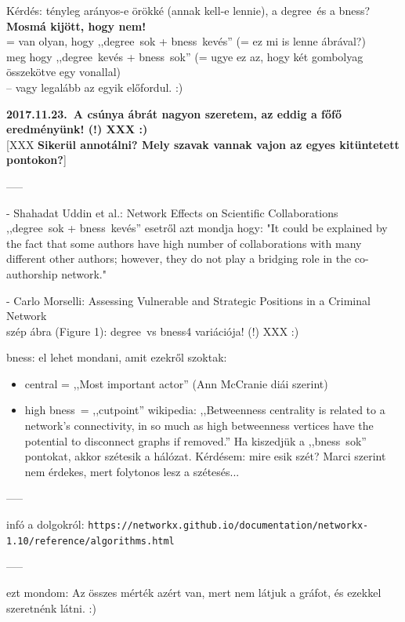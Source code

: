 \documentclass{llncs}
\newcommand{\code}[1]{\texttt{\small #1}}
\newcommand{\embf}[1]{\textbf{#1}}
\newcommand{\XXX}[1]{{\small \color{megjcolor} [XXX #1]}}
\newcommand{\XXXb}[1]{\XXX{\embf{#1}}}
\newcommand{\degree}{degree} %
\newcommand{\bness}{bness}   %
\begin{document}
Kérdés: tényleg arányos-e örökké (annak kell-e lennie),
a \degree\ és a \bness?\\
\embf{Mosmá kijött, hogy nem!}\\
= van olyan, hogy ,,\degree\ sok + \bness\ kevés''
(= ez mi is lenne ábrával?)\\
meg hogy ,,\degree\ kevés + \bness\ sok''
(= ugye ez az, hogy két gombolyag összekötve egy vonallal)\\
-- vagy legalább az egyik előfordul. :)

\embf{2017.11.23.\ A csúnya ábrát nagyon szeretem,
az eddig a főfő eredményünk! (!) XXX :)}\\
\XXXb{Sikerül annotálni?
Mely szavak vannak vajon az egyes kitüntetett pontokon?}

-----

 - Shahadat Uddin et al.:
Network Effects on Scientific Collaborations\\
%
,,\degree\ sok + \bness\ kevés'' esetről azt mondja hogy: 
"It could be explained by the fact that some authors have high number of collaborations with many different other authors; however, they do not play a bridging role in the co-authorship network."

- Carlo Morselli:
Assessing Vulnerable and Strategic Positions in a Criminal Network\\
%
szép ábra (Figure 1): \degree\ vs \bness 4 variációja! (!) XXX :)

\bness: el lehet mondani, amit ezekről szoktak:
\begin{itemize}
\item 
central = ,,Most important actor'' (Ann McCranie diái szerint)
\item 
high \bness\ = ,,cutpoint''
wikipedia: ,,Betweenness centrality is related to a network's connectivity, in so much as high betweenness vertices have the potential to disconnect graphs if removed.''
Ha kiszedjük a ,,\bness\ sok'' pontokat, akkor szétesik a hálózat.
Kérdésem: mire esik szét?
Marci szerint nem érdekes, mert folytonos lesz a szétesés...
\end{itemize}

-----

infó a dolgokról:
\code{https://networkx.github.io/documentation/networkx-1.10/reference/algorithms.html}

-----

ezt mondom:
Az összes mérték azért van, mert nem látjuk a gráfot,
és ezekkel szeretnénk látni. :)
\end{document}
